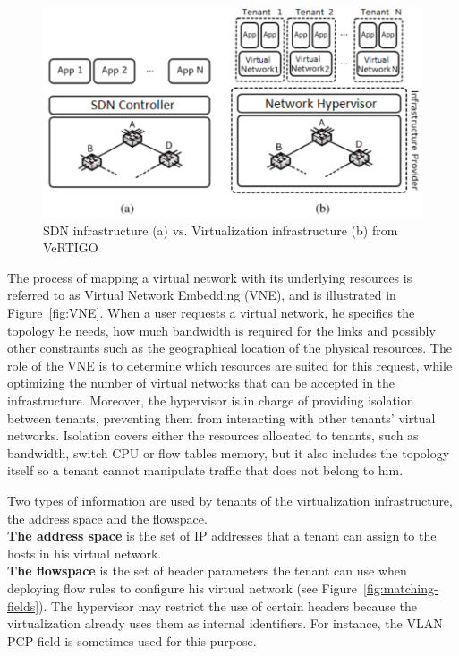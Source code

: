 \begin{figure}[ht]
    \centering
    \includegraphics[scale=0.9]{figures/virt-archi.pdf}
    \caption{SDN infrastructure (a) vs. Virtualization infrastructure (b) from VeRTIGO~\cite{VeRTIGO-Corin2012a}}
    \label{fig:virt-archi}
\end{figure}


The process of mapping a virtual network with its underlying resources is referred to as Virtual Network Embedding (VNE), and is illustrated in Figure~\ref{fig:VNE}.
When a user requests a virtual network, he specifies the topology he needs, how much bandwidth is required for the links and possibly other constraints such as the geographical location of the physical resources.
The role of the VNE is to determine which resources are suited for this request, while optimizing the number of virtual networks that can be accepted in the infrastructure.
Moreover, the hypervisor is in charge of providing isolation between tenants, preventing them from interacting with other tenants' virtual networks. Isolation covers either the resources allocated to tenants, such as bandwidth, switch CPU or flow tables memory, but it also includes the topology itself so a tenant cannot manipulate traffic that does not belong to him.

Two types of information are used by tenants of the virtualization infrastructure, the address space and the flowspace.\\
\textbf{The address space} is the set of IP addresses that a tenant can assign to the hosts in his virtual network.\\
\textbf{The flowspace} is the set of header parameters the tenant can use when deploying flow rules to configure his virtual network (see Figure~\ref{fig:matching-fields}). The hypervisor may restrict the use of certain headers because the virtualization already uses them as internal identifiers.
For instance, the VLAN PCP field is sometimes used for this purpose.

